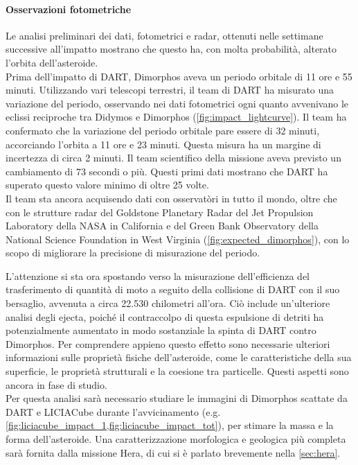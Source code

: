 \documentclass[a4paper,11pt,openright]{book}
\begin{document}
\paragraph*{Osservazioni fotometriche}
Le analisi preliminari dei dati, fotometrici e radar, ottenuti nelle settimane successive all'impatto mostrano che questo ha, con molta probabilità, alterato l'orbita dell'asteroide.\\
Prima dell'impatto di DART, Dimorphos aveva un periodo orbitale di 11 ore e 55 minuti. Utilizzando vari telescopi terrestri, il team di DART ha misurato una variazione del periodo, osservando nei dati fotometrici ogni quanto avvenivano le eclissi reciproche tra Didymos e Dimorphos (\cref{fig:impact_lightcurve}). Il team ha confermato che la variazione del periodo orbitale pare essere di 32 minuti, accorciando l'orbita a 11 ore e 23 minuti. Questa misura ha un margine di incertezza di circa 2 minuti. 
Il team scientifico della missione aveva previsto un cambiamento di 73 secondi o più. Questi primi dati mostrano che DART ha superato questo valore minimo di oltre 25 volte. \\

Il team sta ancora acquisendo dati con osservatòri in tutto il mondo, oltre che con le strutture radar del Goldstone Planetary Radar del Jet Propulsion Laboratory della NASA in California e del Green Bank Observatory della National Science Foundation in West Virginia (\cref{fig:expected_dimorphos}), con lo scopo di migliorare la precisione di misurazione del periodo.

L'attenzione si sta ora spostando verso la misurazione dell'efficienza del trasferimento di quantità di moto a seguito della collisione di DART con il suo bersaglio, avvenuta a circa 22.530 chilometri all'ora. Ciò include un'ulteriore analisi degli ejecta, poiché il contraccolpo di questa espulsione di detriti ha potenzialmente aumentato in modo sostanziale la spinta di DART contro Dimorphos. %
Per comprendere appieno questo effetto sono necessarie ulteriori informazioni sulle proprietà fisiche dell'asteroide, come le caratteristiche della sua superficie, le proprietà strutturali e la coesione tra particelle. Questi aspetti sono ancora in fase di studio.\\
Per questa analisi sarà necessario studiare le immagini di Dimorphos scattate da DART e LICIACube durante l'avvicinamento (e.g. \cref{fig:liciacube_impact_1,fig:liciacube_impact_tot}), per stimare la massa e la forma dell'asteroide. Una caratterizzazione morfologica e geologica più completa sarà fornita dalla missione Hera, di cui si è parlato brevemente nella \cref{sec:hera}.
\end{document}
